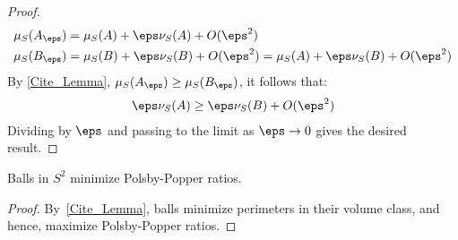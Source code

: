 {\begin{proof}
\begin{align*}
    \mu_S(A_{\eps}) &= \mu_S(A)+\eps\nu_S(A)+O(\eps^2)\\
    \mu_S(B_{\eps}) &= \mu_S(B)+\eps\nu_S(B)+O(\eps^2)
    =\mu_S(A)+\eps\nu_S(B)+O(\eps^2)
  \end{align*}
  By \cref{Cite_Lemma}, 
  $\mu_S(A_{\eps})\ge \mu_S(B_{\eps})$, it follows that:
  \begin{align*}
    \eps\nu_S(A)\ge \eps\nu_S(B)+O(\eps^2)
  \end{align*}
  Dividing by $\eps$ and passing to the limit as $\eps\to 0$ 
  gives the desired result.
\end{proof}
\begin{Corollary} \label{Main_Lemma}
  Balls in $S^2$ minimize Polsby-Popper ratios.
\end{Corollary}
\begin{proof}
  By~\cref{Cite_Lemma}, balls minimize perimeters 
  in their volume class, and hence, maximize Polsby-Popper ratios.
\end{proof}
}

